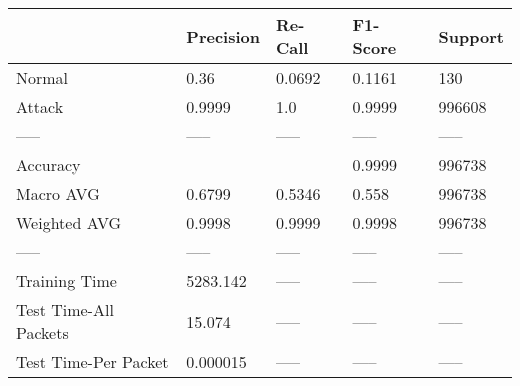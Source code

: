 \begin{tabular}{lllll}
\toprule
{} & Precision & Re-Call & F1-Score & Support \\
\midrule
Normal                &      0.36 &  0.0692 &   0.1161 &     130 \\
Attack                &    0.9999 &     1.0 &   0.9999 &  996608 \\
-----                 &     ----- &   ----- &    ----- &   ----- \\
Accuracy              &           &         &   0.9999 &  996738 \\
Macro AVG             &    0.6799 &  0.5346 &    0.558 &  996738 \\
Weighted AVG          &    0.9998 &  0.9999 &   0.9998 &  996738 \\
-----                 &     ----- &   ----- &    ----- &   ----- \\
Training Time         &  5283.142 &   ----- &    ----- &   ----- \\
Test Time-All Packets &    15.074 &   ----- &    ----- &   ----- \\
Test Time-Per Packet  &  0.000015 &   ----- &    ----- &   ----- \\
\bottomrule
\end{tabular}
